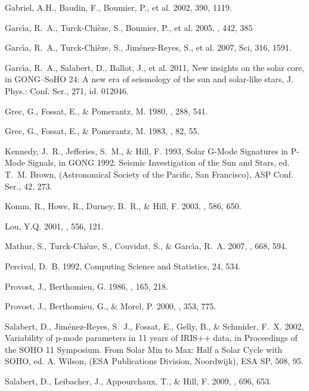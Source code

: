 \documentclass[bibyear]{aa}
\begin{document}
\begin{thebibliography}{}
   Gabriel, A.H., Baudin, F., Boumier, P., et al. 2002, {\aap} 390, 1119.  

  Garc{\'{\i}}a, R.~A., Turck-Chi\`eze, S., Boumier, P., et al. 2005, {\aap}, 442, 385

   Garc{\'{\i}}a, R.~A., Turck-Chi\`eze, S., Jim\'enez-Reyes, S., et al. 2007, Sci, 316, 1591. 

  Garc{\'{\i}}a, R.~A.,   Salabert, D., Ballot, J., et al. 2011, New insights on the solar core, in GONG–SoHO 24: A new era of seismology of the sun and solar-like stars, J. Phys.: Conf. Ser., 271, id. 012046.

 Grec, G., Fossat, E., \& Pomerantz, M. 1980, {\nat}, 288, 541.

 Grec, G., Fossat, E., \& Pomerantz, M. 1983, {\solphys}, 82, 55.

 Kennedy, J.~R., Jefferies, S.~M., \& Hill, F. 1993, Solar G-Mode Signatures in P-Mode Signals, in  GONG 1992. Seismic Investigation of the Sun and Stars, ed. T.~M. Brown, (Astronomical Society of the Pacific, San Francisco), ASP Conf. Ser., 42, 273.

 Komm, R., Howe, R., Durney, B.~R., \& Hill, F. 2003, {\apj}, 586, 650.

  Lou, Y.Q. 2001, {\apj}, 556, 121.  

  Mathur, S., Turck-Chi\`eze, S., Couvidat, S., \& Garc{\'{\i}}a, R.~A. 2007, {\apj}, 668, 594.
  
  Percival, D.~B. 1992, Computing Science and Statistics, 24, 534.
 
   Provost, J., Berthomieu, G. 1986, {\aap}, 165, 218.

   Provost, J., Berthomieu, G., \& Morel, P. 2000, {\aap}, 353, 775.

   Salabert, D., Jim\'enez-Reyes, S.~J., Fossat, E., Gelly, B., \& Schmider, F.~X. 2002, Variability of p-mode parameters in 11 years of IRIS++ data, in Proceedings of the SOHO 11 Symposium. From Solar Min to Max: Half a Solar Cycle with SOHO, ed. A. Wilson, (ESA Publications Division, Noordwijk), ESA SP, 508, 95.

   Salabert, D., Leibacher, J., Appourchaux, T., \& Hill, F. 2009, {\apj}, 696, 653. 
 

\end{thebibliography}
\end{document}
